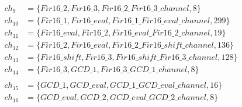 \begin{align*}
    ch_9 &= \{ Fir16\_2, Fir16\_3, Fir16\_2\_Fir16\_3\_channel, 8 \} \\
    ch_{10} &= \{ Fir16\_1, Fir16\_eval, Fir16\_1\_Fir16\_eval\_channel, 299 \} \\
    ch_{11} &= \{ Fir16\_eval, Fir16\_2, Fir16\_eval\_Fir16\_2\_channel, 19 \} \\
    ch_{12} &= \{ Fir16\_2, Fir16\_eval, Fir16\_2\_Fir16\_shift\_channel, 136 \} \\
    ch_{13} &= \{ Fir16\_shift, Fir16\_3, Fir16\_shift\_Fir16\_3\_channel, 128 \} \\
    ch_{14} &= \{ Fir16\_3, GCD\_1, Fir16\_3\_GCD\_1\_channel, 8 \} \\
    \\
    ch_{15} &= \{ GCD\_1, GCD\_eval, GCD\_1\_GCD\_eval\_channel, 16 \} \\
    ch_{16} &= \{ GCD\_eval, GCD\_2, GCD\_eval\_GCD\_2\_channel, 8 \} \\
\end{align*}
\normalsize
%
%
